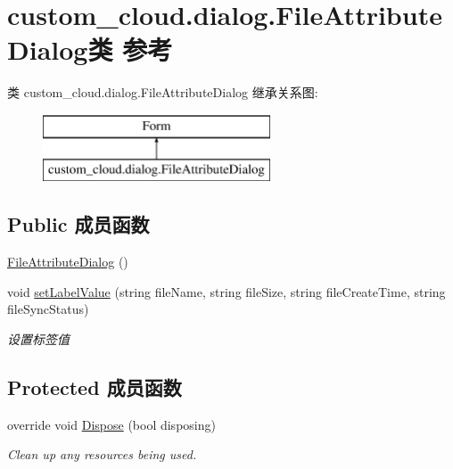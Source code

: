 \hypertarget{classcustom__cloud_1_1dialog_1_1_file_attribute_dialog}{}\section{custom\+\_\+cloud.\+dialog.\+File\+Attribute\+Dialog类 参考}
\label{classcustom__cloud_1_1dialog_1_1_file_attribute_dialog}
类 custom\+\_\+cloud.\+dialog.\+File\+Attribute\+Dialog 继承关系图\+:\begin{figure}[H]
\begin{center}
\leavevmode
\includegraphics[height=2.000000cm]{classcustom__cloud_1_1dialog_1_1_file_attribute_dialog}
\end{center}
\end{figure}
\subsection*{Public 成员函数}
\begin{DoxyCompactItemize}
\item 
\hyperlink{classcustom__cloud_1_1dialog_1_1_file_attribute_dialog_a14e3a70e46fa7f38b8383363d5f4206a}{File\+Attribute\+Dialog} ()
\item 
void \hyperlink{classcustom__cloud_1_1dialog_1_1_file_attribute_dialog_a57a11d2fd485c014944a7f3ef7d6b311}{set\+Label\+Value} (string file\+Name, string file\+Size, string file\+Create\+Time, string file\+Sync\+Status)
\begin{DoxyCompactList}\small\item\em 设置标签值 \end{DoxyCompactList}\end{DoxyCompactItemize}
\subsection*{Protected 成员函数}
\begin{DoxyCompactItemize}
\item 
override void \hyperlink{classcustom__cloud_1_1dialog_1_1_file_attribute_dialog_ac87b5986a98f8d82c9874792a679ba0a}{Dispose} (bool disposing)
\begin{DoxyCompactList}\small\item\em Clean up any resources being used. \end{DoxyCompactList}\end{DoxyCompactItemize}


